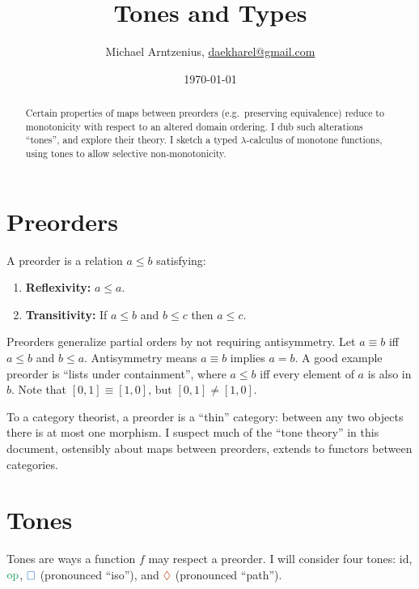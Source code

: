 \documentclass[ribbons]{rntz}
\title{Tones and Types}
\author{Michael Arntzenius, %
  \href{mailto:daekharel@gmail.com}{daekharel@gmail.com}}
\date{\today}
\newcommand\opcolor{\color{ForestGreen}}
\newcommand\isocolor{\color{NavyBlue}}
\newcommand\pathcolor{\color{Bittersweet}}
\newcommand\id{\ensuremath{\mathrm{id}}}
\newcommand\op{\ensuremath{\mathrm{\opcolor op}}}
\newcommand\iso{\texorpdfstring{\ensuremath{{\isocolor\Box}}}{iso}}
\renewcommand\path{\texorpdfstring{\ensuremath{{\pathcolor\lozenge}}}{path}}
\begin{document}
\maketitle

\begin{abstract}
 Certain properties of maps between preorders (e.g.\ preserving equivalence)
 reduce to monotonicity with respect to an altered domain ordering. I dub such
 alterations ``tones'', and explore their theory. I sketch a typed
 $\lambda$-calculus of monotone functions, using tones to allow selective
 non-mono\-tonicity.
\end{abstract}

\section{Preorders}

A preorder is a relation $a \le b$ satisfying:
\begin{enumerate}
\item \textbf{Reflexivity:} $a \le a$.
\item \textbf{Transitivity:} If $a \le b$ and $b \le c$ then $a \le c$.
\end{enumerate}

Preorders generalize partial orders by not requiring antisymmetry. Let
$a \equiv b$ iff $a \le b$ and $b \le a$. Antisymmetry means $a \equiv b$
implies $a = b$.
%
A good example preorder is ``lists under containment'', where $a \le b$ iff
every element of $a$ is also in $b$. Note that $[0,1] \equiv [1,0]$, but $[0,1]
\ne [1,0]$.

To a category theorist, a preorder is a ``thin'' category: between any two
objects there is at most one morphism. I suspect much of the ``tone theory'' in
this document, ostensibly about maps between preorders, extends to functors
between categories.


\section{Tones}\label{sec:tones}

Tones are ways a function $f$ may respect a preorder. I will consider four
tones: \id, \op, \iso{} (pronounced ``iso''), and \path{} (pronounced ``path'').
\end{document}
